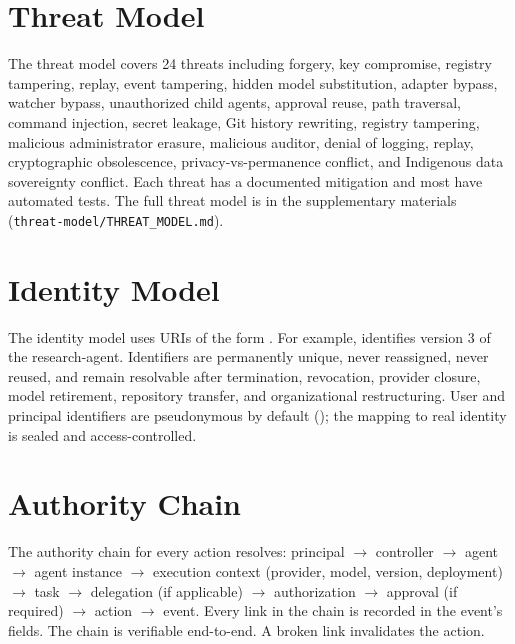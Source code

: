 \documentclass[11pt,a4paper]{article}
\begin{document}
\section{Threat Model}
\label{sec:threat-model}

The threat model covers 24 threats including forgery, key compromise, registry tampering, replay, event tampering, hidden model substitution, adapter bypass, watcher bypass, unauthorized child agents, approval reuse, path traversal, command injection, secret leakage, Git history rewriting, registry tampering, malicious administrator erasure, malicious auditor, denial of logging, replay, cryptographic obsolescence, privacy-vs-permanence conflict, and Indigenous data sovereignty conflict. Each threat has a documented mitigation and most have automated tests. The full threat model is in the supplementary materials (\texttt{threat-model/THREAT\_MODEL.md}).

\section{Identity Model}
\label{sec:identity-model}

The identity model uses URIs of the form . For example,  identifies version 3 of the research-agent. Identifiers are permanently unique, never reassigned, never reused, and remain resolvable after termination, revocation, provider closure, model retirement, repository transfer, and organizational restructuring. User and principal identifiers are pseudonymous by default (); the mapping to real identity is sealed and access-controlled.

\section{Authority Chain}
\label{sec:authority-chain}

The authority chain for every action resolves: principal $\rightarrow$ controller $\rightarrow$ agent $\rightarrow$ agent instance $\rightarrow$ execution context (provider, model, version, deployment) $\rightarrow$ task $\rightarrow$ delegation (if applicable) $\rightarrow$ authorization $\rightarrow$ approval (if required) $\rightarrow$ action $\rightarrow$ event. Every link in the chain is recorded in the event's fields. The chain is verifiable end-to-end. A broken link invalidates the action.
\end{document}
